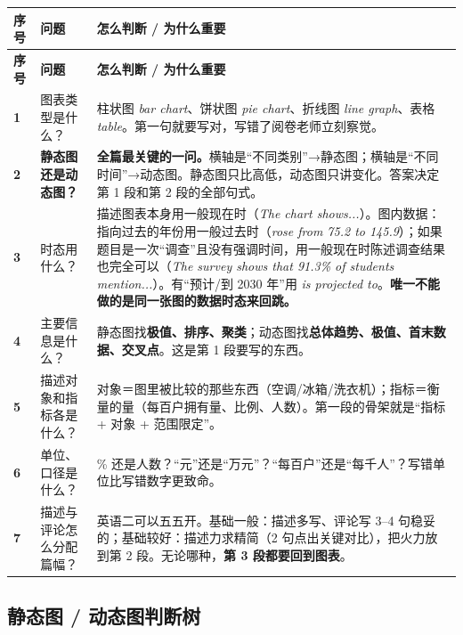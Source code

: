 \documentclass[11pt,a4paper]{ctexart}
\newcommand{\en}[1]{\textit{#1}}
\begin{document}
\begin{longtable}{C{0.9cm} L{3.6cm} L{11.0cm}}
\toprule
\textbf{序号} & \textbf{问题} & \textbf{怎么判断 / 为什么重要}\\
\midrule
\endfirsthead
\toprule
\textbf{序号} & \textbf{问题} & \textbf{怎么判断 / 为什么重要}\\
\midrule
\endhead
\textbf{1} & 图表类型是什么？ & 柱状图 \en{bar chart}、饼状图 \en{pie chart}、折线图 \en{line graph}、表格 \en{table}。第一句就要写对，写错了阅卷老师立刻察觉。\\
\midrule
\textbf{2} & \textbf{静态图还是动态图？} & \textbf{全篇最关键的一问。}横轴是“不同类别”→静态图；横轴是“不同时间”→动态图。静态图只比高低，动态图只讲变化。答案决定第 1 段和第 2 段的全部句式。\\
\midrule
\textbf{3} & 时态用什么？ & 描述图表本身用一般现在时（\en{The chart shows...}）。图内数据：指向过去的年份用一般过去时（\en{rose from 75.2 to 145.9}）；如果题目是一次“调查”且没有强调时间，用一般现在时陈述调查结果也完全可以（\en{The survey shows that 91.3\% of students mention...}）。有“预计/到 2030 年”用 \en{is projected to}。\textbf{唯一不能做的是同一张图的数据时态来回跳。}\\
\midrule
\textbf{4} & 主要信息是什么？ & 静态图找\textbf{极值、排序、聚类}；动态图找\textbf{总体趋势、极值、首末数据、交叉点}。这是第 1 段要写的东西。\\
\midrule
\textbf{5} & 描述对象和指标各是什么？ & 对象＝图里被比较的那些东西（空调/冰箱/洗衣机）；指标＝衡量的量（每百户拥有量、比例、人数）。第一段的骨架就是“指标 + 对象 + 范围限定”。\\
\midrule
\textbf{6} & 单位、口径是什么？ & \% 还是人数？“元”还是“万元”？“每百户”还是“每千人”？写错单位比写错数字更致命。\\
\midrule
\textbf{7} & 描述与评论怎么分配篇幅？ & 英语二可以五五开。基础一般：描述多写、评论写 3--4 句稳妥的；基础较好：描述力求精简（2 句点出关键对比），把火力放到第 2 段。无论哪种，\textbf{第 3 段都要回到图表}。\\
\bottomrule
\end{longtable}

\subsection{静态图 / 动态图判断树}
\end{document}
